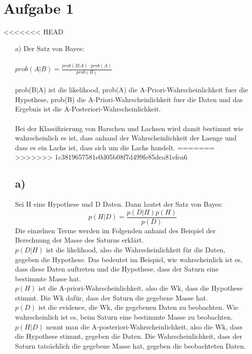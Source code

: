 \documentclass[a4paper]{scrartcl}
\begin{document}
	
\section*{Aufgabe 1}
<<<<<<< HEAD
\begin{itemize}
	\item[a)] Der Satz von Bayes:\\ \ \\
	$prob(A|B) = \frac{prob(B|A) \cdot prob(A)}{prob(B)}$\\
	\ \\
	prob(B$|$A) ist die likelihood, prob(A) die A-Priori-Wahrscheinlichkeit fuer die Hypothese, prob(B) die A-Priori-Wahrscheinlichkeit fuer die Daten und das Ergebnis ist die A-Posteriori-Wahrscheinlichkeit.\\
	\ \\
	Bei der Klassifizierung von Barschen und Lachsen wird damit bestimmt wie wahrscheinlich es ist, dass anhand der Wahrscheinlichkeit der Laenge und dass es ein Lachs ist, dass sich um die Lachs handelt. 
=======
>>>>>>> 1c3819657581e0d05b08f7d499fe85dea81efea6

	\subsection*{a)} Sei H eine Hypothese und D Daten. Dann lautet der Satz von Bayes: $$p(H|D) = \frac{p(D|H)p(H)}{p(D)}$$
	Die einzelnen Terme werden im Folgenden anhand des Beispiel der Berechnung der Masse des Saturns erklärt.\\
	$p(D|H)$ ist die likelihood, also die Wahrscheinlichkeit für die Daten, gegeben die Hypothese. Das bedeutet im Beispiel, wie wahrscheinlich ist es, dass diese Daten auftreten und die Hypothese, dass der Saturn eine bestimmte Masse hat.\\
	$p(H)$ ist die A-priori-Wahrscheinlichkeit, also die Wk, dass die Hypothese stimmt. Die Wk dafür, dass der Saturn die gegebene Masse hat.\\
	$p(D)$ ist die evidence, die Wk, die gegebenen Daten zu beobachten. Wie wahrscheinlich ist es, beim Saturn eine bestimmte Masse zu beobachten.\\
	$p(H|D)$ nennt man die A-posteriori-Wahrscheinlichkeit, also die Wk, dass die Hypothese stimmt, gegeben die Daten. Die Wahrscheinlichkeit, dass der Saturn tatsächlich die gegebene Masse hat, gegeben die beobachteten Daten.


\end{itemize}
\end{document}
